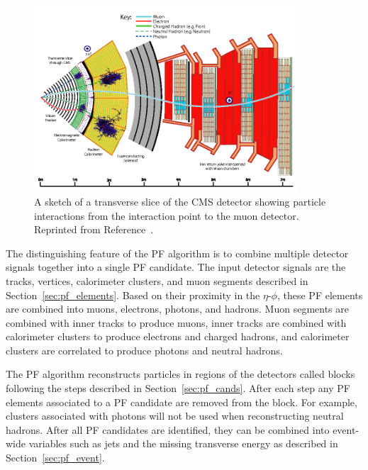 \begin{figure}[htbp]
  \begin{center}
    \includegraphics[width=0.875\textwidth]{Reconstruction/Figures/cms_slice.png}
    \caption{
      A sketch of a transverse slice of the CMS detector showing particle interactions from the interaction point to the muon detector.
      Reprinted from Reference~\cite{}. %
    }
    \label{fig:cms_slice}
  \end{center}
\end{figure}

The distinguishing feature of the PF algorithm is to combine multiple detector signals together into a single PF candidate.
The input detector signals are the tracks, vertices, calorimeter clusters, and muon segments described in Section~\ref{sec:pf_elements}.
Based on their proximity in the $\eta$-$\phi$, these PF elements are combined into muons, electrons, photons, and hadrons.
Muon segments are combined with inner tracks to produce muons, inner tracks are combined with calorimeter clusters to produce electrons and charged hadrons, and calorimeter clusters are correlated to produce photons and neutral hadrons.

The PF algorithm reconstructs particles in regions of the detectors called blocks following the steps described in Section~\ref{sec:pf_cands}.
After each step any PF elements associated to a PF candidate are removed from the block.
For example, clusters associated with photons will not be used when reconstructing neutral hadrons.
After all PF candidates are identified, they can be combined into event-wide variables such as jets and the missing transverse energy as described in Section~\ref{sec:pf_event}. 

